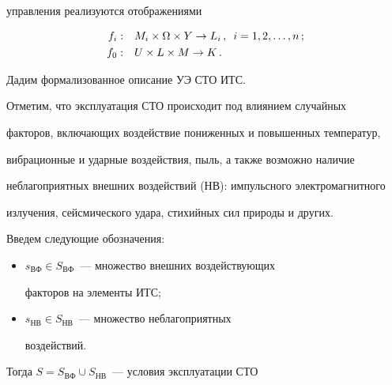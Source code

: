 управ\-ле\-ния реализуются отображениями


     \begin{align*}


     f_i: &\ \ \ M_i \times \Omega \times Y \rightarrow  L_i\,,\enskip  i = 1, 2, \ldots , 


n\,; %


\\


     f_0: &\ \ \ U \times L \times M \rightarrow  K\,.  %


     \end{align*}


  


  Дадим формализованное описание УЭ СТО ИТС.


  


  Отметим, что эксплуатация СТО происходит под влиянием случайных 


факторов, включающих воздействие пониженных и повышенных температур, 


вибрационные и ударные воздействия, пыль, а также возможно наличие 


неблагоприятных внешних воздействий (НВ): импульсного электромагнитного 


излучения, сейсмического удара, стихийных сил природы и других.


\pagebreak


  


  Введем следующие обозначения: 


  \begin{itemize}


\item   $s_{\mathrm{ВФ}}\in S_{\mathrm{ВФ}}$~--- множество внешних воздействующих 


факторов на элементы ИТС;


  \item


  $s_{\mathrm{НВ}}\in S_{\mathrm{НВ}}$~--- множество неблагоприятных 


воздействий.


\end{itemize}


  


  


  Тогда $S = S_{\mathrm{ВФ}}\cup S_{\mathrm{НВ}}$~--- условия эксплуатации СТО 


